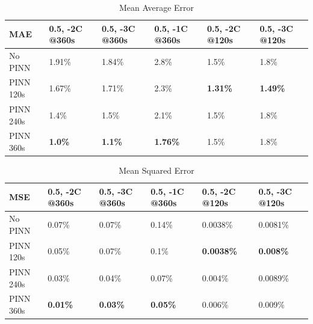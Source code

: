 
\begin{table}[ht]
\label{tab:sandia-results-mae}
    \centering
    \begin{tabular}{|l|l|l|l|l|l|}
    \hline
        MAE & 0.5, -2C @360s & 0.5, -3C @360s & 0.5, -1C @360s & 0.5, -2C @120s & 0.5, -3C @120s  \\ \hline
        No PINN & 1.91\% & 1.84\% & 2.8\% & 1.5\% & 1.8\%  \\ \hline
        PINN 120s & 1.67\% & 1.71\% & 2.3\% & \textbf{1.31\%} & \textbf{1.49\%}  \\ \hline
        PINN 240s & 1.4\% & 1.5\% & 2.1\% & 1.5\% & 1.8\%  \\ \hline
        PINN 360s & \textbf{1.0\%} & \textbf{1.1\%} & \textbf{1.76\%} & 1.5\% & 1.8\% \\ \hline
    \end{tabular}
    \caption{Mean Average Error}
\end{table}

\begin{table}[!ht]
\label{tab:sandia-results-mse}
    \centering
    \begin{tabular}{|l|l|l|l|l|l|}
    \hline
        MSE & 0.5, -2C @360s & 0.5, -3C @360s & 0.5, -1C @360s & 0.5, -2C @120s & 0.5, -3C @120s \\ \hline
        No PINN & 0.07\% & 0.07\% & 0.14\% & 0.0038\% & 0.0081\%\\ \hline
        PINN 120s & 0.05\% & 0.07\% & 0.1\% & \textbf{0.0038\%} & \textbf{0.008\%} \\ \hline
        PINN 240s & 0.03\% & 0.04\% & 0.07\% & 0.004\% & 0.0089\% \\ \hline
        PINN 360s & \textbf{0.01\%} & \textbf{0.03\%} & \textbf{0.05\%} & 0.006\% & 0.009\% \\ \hline
    \end{tabular}
    \caption{Mean Squared Error}
\end{table}